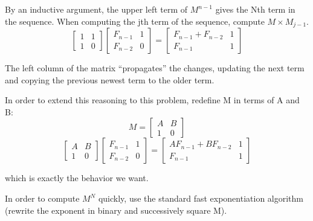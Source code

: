 \documentclass[11pt, oneside]{article}
\begin{document}
By an inductive argument, the upper left term of \( M^{n - 1} \) gives the
Nth term in the sequence.
When computing the jth term of the sequence, compute \( M \times M_{j - 1} \).
\[ \begin{bmatrix} 1 & 1 \\ 1 & 0 \end{bmatrix} \begin{bmatrix} F_{n - 1} & 1 \\ F_{n - 2} & 0 \end{bmatrix}
=  \begin{bmatrix} F_{n - 1} + F_{n - 2} & 1 \\ F_{n - 1} & 1 \end{bmatrix}\]

The left column of the matrix ``propagates'' the changes, updating the next term
and copying the previous newest term to the older term.

In order to extend this reasoning to this problem, redefine M in terms of A and B:
\[ M = \begin{bmatrix} A & B \\ 1 & 0 \end{bmatrix} \]
\[ \begin{bmatrix} A & B \\ 1 & 0 \end{bmatrix} \begin{bmatrix} F_{n - 1} & 1 \\ F_{n - 2} & 0 \end{bmatrix}
=  \begin{bmatrix} A F_{n - 1} + B F_{n - 2} & 1 \\ F_{n - 1} & 1 \end{bmatrix}\]

which is exactly the behavior we want.

In order to compute \( M^N \) quickly, use the standard fast exponentiation algorithm
(rewrite the exponent in binary and successively square M).

\newpage
\end{document}
